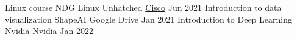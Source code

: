 \begin{cvhonors}
  \cvhonor
    {Linux course}
    {NDG Linux Unhatched}
    {\href{https://bit.ly/3dAh50b}{Cisco}}
    {Jun 2021}
  \cvhonor
    {Introduction to data visualization}
    {ShapeAI}
    {Google Drive}
    {Jan 2021}
    \cvhonor
    {Introduction to Deep Learning}
    {Nvidia}
    {\href{https://courses.nvidia.com/certificates/b814cc802edc4bdea25a2214eac789e4}{Nvidia}}
    {Jan 2022}
\end{cvhonors}

\vspace{-3mm}